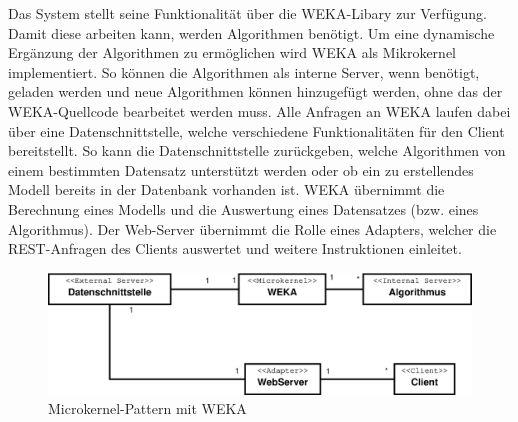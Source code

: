 Das System stellt seine Funktionalität über die WEKA-Libary zur Verfügung. Damit diese arbeiten kann, werden Algorithmen benötigt. 
Um eine dynamische Ergänzung der Algorithmen zu ermöglichen wird WEKA als Mikrokernel implementiert. 
So können die Algorithmen als interne Server, wenn benötigt, geladen werden und neue Algorithmen können hinzugefügt werden, ohne das der WEKA-Quellcode bearbeitet werden muss. 
Alle Anfragen an WEKA laufen dabei über eine Datenschnittstelle, welche verschiedene Funktionalitäten für den Client bereitstellt.
So kann die Datenschnittstelle zurückgeben, welche Algorithmen von einem bestimmten Datensatz unterstützt werden oder ob ein zu erstellendes Modell bereits in der Datenbank vorhanden ist. 
WEKA übernimmt die Berechnung eines Modells und die Auswertung eines Datensatzes (bzw. eines Algorithmus). 
Der Web-Server übernimmt die Rolle eines Adapters, welcher die REST-Anfragen des Clients auswertet und weitere Instruktionen einleitet.
\begin{figure}[h]
\centering
	\vspace{-5pt}
\includegraphics[width=0.7\linewidth]{Grafik/Diagramm/Microkernel}
\caption[Microkernel-Klassen]{Microkernel-Pattern mit WEKA}
\label{fig:Microkernel}
\end{figure}